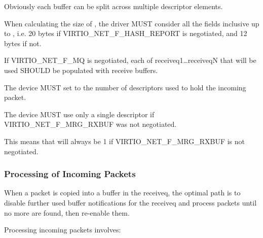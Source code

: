 \begin{note}
Obviously each buffer can be split across multiple descriptor elements.
\end{note}

When calculating the size of , the driver
MUST consider all the fields inclusive up to ,
i.e. 20 bytes if VIRTIO_NET_F_HASH_REPORT is negotiated, and 12 bytes if not.

If VIRTIO_NET_F_MQ is negotiated, each of receiveq1\ldots receiveqN
that will be used SHOULD be populated with receive buffers.


The device MUST set  to the number of descriptors used to
hold the incoming packet.

The device MUST use only a single descriptor if VIRTIO_NET_F_MRG_RXBUF
was not negotiated.
\begin{note}
{This means that  will always be 1
if VIRTIO_NET_F_MRG_RXBUF is not negotiated.}
\end{note}

\subsubsection{Processing of Incoming Packets}\label{sec:Device Types / Network Device / Device Operation / Processing of Incoming Packets}
\label{sec:Device Types / Network Device / Device Operation / Processing of Packets}%

When a packet is copied into a buffer in the receiveq, the
optimal path is to disable further used buffer notifications for the
receiveq and process packets until no more are found, then re-enable
them.

Processing incoming packets involves:

